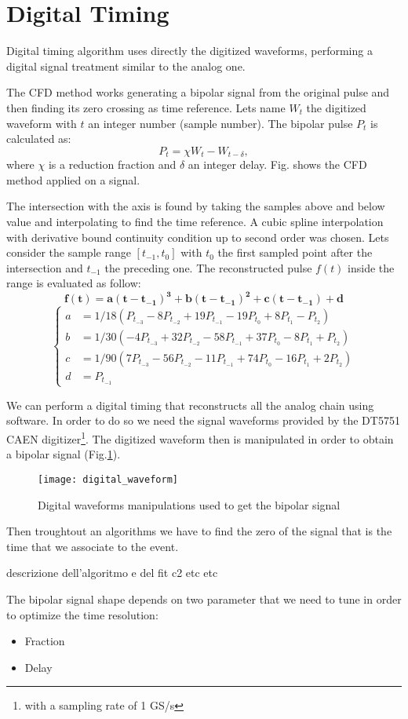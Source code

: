 \section*{Digital Timing}
Digital timing algorithm uses directly the digitized waveforms, performing a digital signal treatment similar to the analog one.
 
The CFD method works generating a bipolar signal from the original pulse and then finding its zero crossing as time reference. Lets name $W_t$ the digitized waveform with $t$ an integer number (sample number). The bipolar pulse $P_t$ is calculated as:
\begin{equation}
P_t=\chi W_t-W_{t-\delta},
\label{eq:bipolarCFD}
\end{equation}
where $\chi$ is a reduction fraction and $\delta$ an integer delay. Fig. shows the CFD method applied on a signal. 



The intersection with the axis is found by taking the samples above and below  value and interpolating to find the time reference. 
A cubic spline interpolation with derivative bound continuity condition up to second order was chosen.
Lets consider the sample range $[t_{-1},t_{0}]$ with $t_{0}$ the first sampled point after the intersection and $t_{-1}$ the preceding one. The reconstructed pulse $f(t)$ inside the range is evaluated as follow:\\
\[\mathbf{f(t)=a (t-t_{-1})^3+b (t-t_{-1})^2+c (t-t_{-1})+d}\]
\[
\left\{
\begin{aligned}
a &=1/18 (P_{t_{-3}}-8 P_{t_{-2}}+19 P_{t_{-1}}-19 P_{t_{0}}+8 P_{t_{1}}-P_{t_{2}})\\
b &=1/30 (-4 P_{t_{-3}}+32 P_{t_{-2}}-58 P_{t_{-1}}+37 P_{t_{0}}-8 P_{t_{1}}+ P_{t_{2}})\\
c &=1/90 (7 P_{t_{-3}}-56 P_{t_{-2}}-11 P_{t_{-1}}+74 P_{t_{0}}-16 P_{t_{1}}+2 P_{t_{2}})\\
d &=P_{t_{-1}}
\end{aligned}
\right.
\]




We can perform a digital timing that reconstructs all the analog chain using software. In order to do so we need the signal waveforms provided by the DT5751 CAEN digitizer\footnote{with a sampling rate of 1 GS/s}.
The digitized waveform then is manipulated in order to obtain a bipolar signal (Fig.\ref{Fig: digital waveform manipulations}).
\begin{figure}[h!]
\centering
\texttt{[image: digital\_waveform]}
\caption{Digital waveforms manipulations used to get the bipolar signal}
\label{Fig: digital waveform manipulations}
\end{figure}
Then troughtout an algorithms we have to find the zero of the signal that is the time that we associate to the event.

\medskip
descrizione dell'algoritmo e del fit c2 etc etc
\medskip

\noindent The bipolar signal shape depends on two parameter that we need to tune in order to optimize the time resolution:
\begin{itemize}
\item Fraction
\item Delay
\end{itemize}


